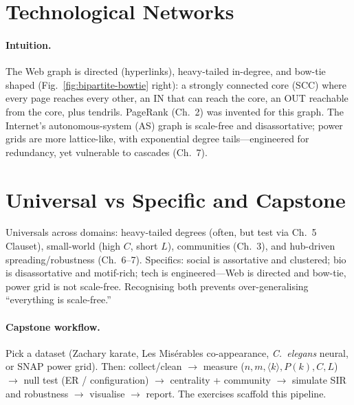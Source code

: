 \section{Technological Networks}
\label{sec:tech}
\paragraph{Intuition.} The Web graph is directed (hyperlinks), heavy-tailed in-degree, and bow-tie shaped (Fig.~\ref{fig:bipartite-bowtie} right): a strongly connected core (SCC) where every page reaches every other, an IN that can reach the core, an OUT reachable from the core, plus tendrils. PageRank (Ch.~2) was invented for this graph. The Internet's autonomous-system (AS) graph is scale-free and disassortative; power grids are more lattice-like, with exponential degree tails---engineered for redundancy, yet vulnerable to cascades (Ch.~7).

\section{Universal vs Specific and Capstone}
\label{sec:capstone}
Universals across domains: heavy-tailed degrees (often, but test via Ch.~5 Clauset), small-world (high $C$, short $L$), communities (Ch.~3), and hub-driven spreading/robustness (Ch.~6--7). Specifics: social is assortative and clustered; bio is disassortative and motif-rich; tech is engineered---Web is directed and bow-tie, power grid is not scale-free. Recognising both prevents over-generalising ``everything is scale-free.''

\paragraph{Capstone workflow.} Pick a dataset (Zachary karate, Les Mis\'erables co-appearance, \emph{C.~elegans} neural, or SNAP power grid). Then: collect/clean $\to$ measure ($n,m,\langle k\rangle,P(k),C,L$) $\to$ null test (ER / configuration) $\to$ centrality + community $\to$ simulate SIR and robustness $\to$ visualise $\to$ report. The exercises scaffold this pipeline.

